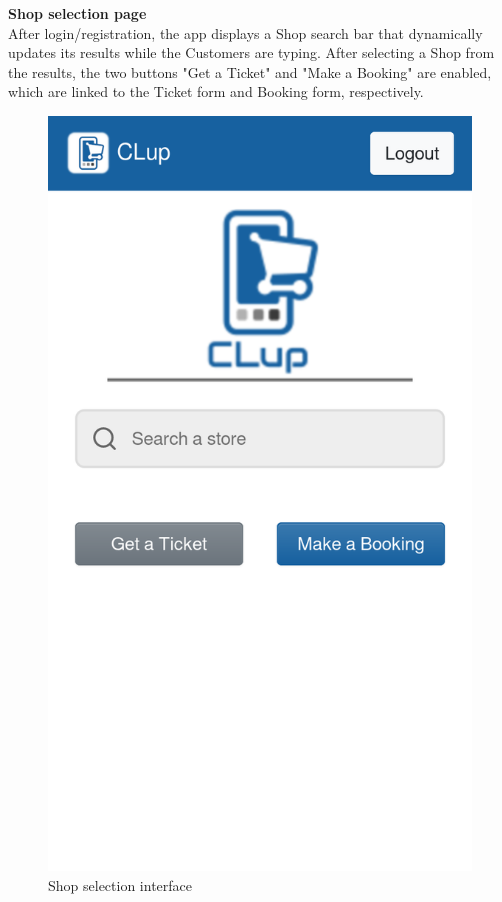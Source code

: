 \textbf{Shop selection page}\\
\label{page:home}
After login/registration, the app displays a Shop search bar that dynamically updates its results while the Customers are typing. After selecting a Shop from the results, the two buttons "Get a Ticket" and "Make a Booking" are enabled, which are linked to the Ticket form and Booking form, respectively.
\begin{figure}[H]
    \centering
    \includegraphics[scale=0.25]{Images/home-mockup.png}
    \caption{Shop selection interface}
\end{figure}
